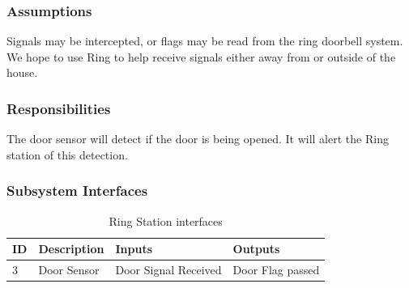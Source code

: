 \subsubsection{Assumptions}
Signals may be intercepted, or flags may be read from the ring doorbell system. We hope to use Ring to help receive signals either away from or outside of the house.

\subsubsection{Responsibilities}
The door sensor will detect if the door is being opened. It will alert the Ring station of this detection.

\subsubsection{Subsystem Interfaces}

\begin {table}[H]
\caption {Ring Station interfaces} 
\begin{center}
    \begin{tabular}{ | p{1cm} | p{6cm} | p{3cm} | p{3cm} |}
    \hline
    ID & Description & Inputs & Outputs \\ \hline
    3 & Door Sensor & Door Signal Received & Door Flag passed  \\ \hline
    \end{tabular}
\end{center}
\end{table}
